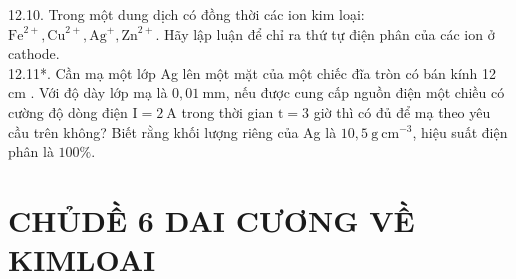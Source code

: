\documentclass[10pt]{article}
\begin{document}
12.10. Trong một dung dịch có đồng thời các ion kim loại: $\mathrm{Fe}^{2+}, \mathrm{Cu}^{2+}, \mathrm{Ag}^{+}, \mathrm{Zn}^{2+}$. Hãy lập luận để chỉ ra thứ tự điện phân của các ion ở cathode.\\
12.11*. Cần mạ một lớp Ag lên một mặt của một chiếc đĩa tròn có bán kính 12 cm . Với độ dày lớp mạ là $0,01 \mathrm{~mm}$, nếu được cung cấp nguồn điện một chiều có cường độ dòng điện $\mathrm{I}=2 \mathrm{~A}$ trong thời gian $\mathrm{t}=3$ giờ thì có đủ để mạ theo yêu cầu trên không? Biết rằng khối lượng riêng của Ag là $10,5 \mathrm{~g} \mathrm{~cm}^{-3}$, hiệu suất điện phân là $100 \%$.

\section*{CHỦDỀ 6 DAI CƯƠNG VỀ KIMLOAI}
\end{document}
